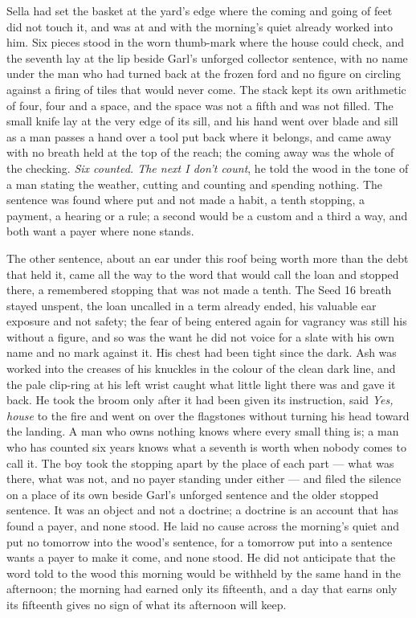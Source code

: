 Sella had set the basket at the yard's edge where the coming and going of feet did not touch it, and  was at  and  with the morning's quiet already worked into him. Six pieces stood in the worn thumb-mark where the house could check, and the seventh lay at the lip beside Garl's unforged collector sentence, with no name under the man who had turned back at the frozen ford and no figure on  circling against a firing of tiles that would never come. The stack kept its own arithmetic of four, four and a space, and the space was not a fifth and was not filled. The small knife lay at the very edge of its sill, and his hand went over blade and sill as a man passes a hand over a tool put back where it belongs, and came away with no breath held at the top of the reach; the coming away was the whole of the checking. \emph{Six counted. The next I don't count}, he told the wood in the tone of a man stating the weather, cutting and counting and spending nothing. The sentence was found where put and not made a habit, a tenth stopping, a payment, a hearing or a rule; a second would be a custom and a third a way, and both want a payer where none stands.

The other sentence, about an ear under this roof being worth more than the debt that held it, came all the way to the word that would call the loan and stopped there, a remembered stopping that was not made a tenth. The Seed 16 breath stayed unspent, the loan uncalled in a term already ended, his valuable ear exposure and not safety; the fear of being entered again for vagrancy was still his without a figure, and so was the want he did not voice for a slate with his own name and no mark against it. His chest had been tight since the dark. Ash was worked into the creases of his knuckles in the colour of the clean dark line, and the pale clip-ring at his left wrist caught what little light there was and gave it back. He took the broom only after it had been given its instruction, said \emph{Yes, house} to the fire and went on over the flagstones without turning his head toward the landing. A man who owns nothing knows where every small thing is; a man who has counted six years knows what a seventh is worth when nobody comes to call it. The boy took the stopping apart by the place of each part --- what was there, what was not, and no payer standing under either --- and filed the silence on a place of its own beside Garl's unforged sentence and the older stopped sentence. It was an object and not a doctrine; a doctrine is an account that has found a payer, and none stood. He laid no cause across the morning's quiet and put no tomorrow into the wood's sentence, for a tomorrow put into a sentence wants a payer to make it come, and none stood. He did not anticipate that the word told to the wood this morning would be withheld by the same hand in the afternoon; the morning had earned only its fifteenth, and a day that earns only its fifteenth gives no sign of what its afternoon will keep.

